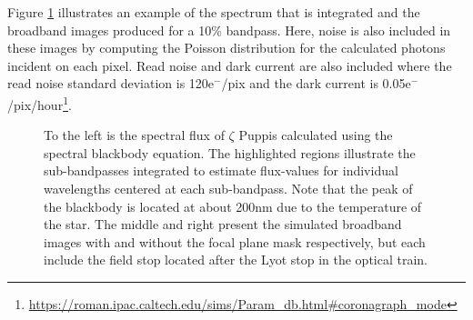 \documentclass[12pt]{spieman}  %
\newcommand{\electron}{$\text{e}^-$}
\begin{document}
\begin{spacing}{2}
Figure \ref{fig:blackbody} illustrates an example of the spectrum that is integrated and the broadband images produced for a 10\% bandpass. Here, noise is also included in these images by computing the Poisson distribution for the calculated photons incident on each pixel. Read noise and dark current are also included where the read noise standard deviation is 120\electron/pix and the dark current is 0.05\electron/pix/hour\footnote{\href{https://roman.ipac.caltech.edu/sims/Param_db.html\#coronagraph_mode}{https://roman.ipac.caltech.edu/sims/Param\_db.html\#coronagraph\_mode}}. 

\begin{figure}[h]
    \centering
    \caption{To the left is the spectral flux of $\zeta$ Puppis calculated using the spectral blackbody equation. The highlighted regions illustrate the sub-bandpasses integrated to estimate flux-values for individual wavelengths centered at each sub-bandpass. Note that the peak of the blackbody is located at about 200nm due to the temperature of the star. The middle and right present the simulated broadband images with and without the focal plane mask respectively, but each include the field stop located after the Lyot stop in the optical train. }
    \label{fig:blackbody}
\end{figure}


\end{spacing}
\end{document}
